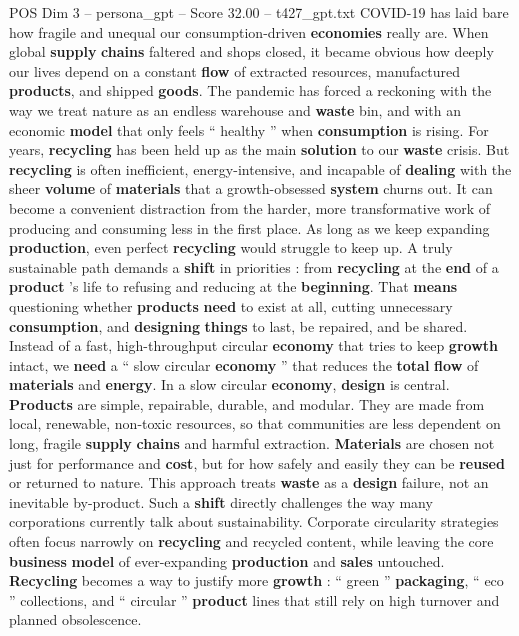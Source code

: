 \begin{textsample}{POS Dim 3 – persona\_gpt – Score 32.00 – t427\_gpt.txt}  \label{ex:f3_pos_026}
COVID-19 has laid bare how fragile and unequal our consumption-driven \textbf{economies} really are.
When global \textbf{supply} \textbf{chains} faltered and shops closed, it became obvious how deeply our lives depend on a constant \textbf{flow} of extracted resources, manufactured \textbf{products}, and shipped \textbf{goods}.
The pandemic has forced a reckoning with the way we treat nature as an endless warehouse and \textbf{waste} bin, and with an economic \textbf{model} that only feels “ healthy ” when \textbf{consumption} is rising.
For years, \textbf{recycling} has been held up as the main \textbf{solution} to our \textbf{waste} crisis.
But \textbf{recycling} is often inefficient, energy-intensive, and incapable of \textbf{dealing} with the sheer \textbf{volume} of \textbf{materials} that a growth-obsessed \textbf{system} churns out.
It can become a convenient distraction from the harder, more transformative work of producing and consuming less in the first place.
As long as we keep expanding \textbf{production}, even perfect \textbf{recycling} would struggle to keep up.
A truly sustainable path demands a \textbf{shift} in priorities : from \textbf{recycling} at the \textbf{end} of a \textbf{product} ’s life to refusing and reducing at the \textbf{beginning}.
That \textbf{means} questioning whether \textbf{products} \textbf{need} to exist at all, cutting unnecessary \textbf{consumption}, and \textbf{designing} \textbf{things} to last, be repaired, and be shared.
Instead of a fast, high-throughput circular \textbf{economy} that tries to keep \textbf{growth} intact, we \textbf{need} a “ slow circular \textbf{economy} ” that reduces the \textbf{total} \textbf{flow} of \textbf{materials} and \textbf{energy}.
In a slow circular \textbf{economy}, \textbf{design} is central. \textbf{Products} are simple, repairable, durable, and modular.
They are made from local, renewable, non-toxic resources, so that communities are less dependent on long, fragile \textbf{supply} \textbf{chains} and harmful extraction. \textbf{Materials} are chosen not just for performance and \textbf{cost}, but for how safely and easily they can be \textbf{reused} or returned to nature.
This approach treats \textbf{waste} as a \textbf{design} failure, not an inevitable by-product.
Such a \textbf{shift} directly challenges the way many corporations currently talk about sustainability.
Corporate circularity strategies often focus narrowly on \textbf{recycling} and recycled content, while leaving the core \textbf{business} \textbf{model} of ever-expanding \textbf{production} and \textbf{sales} untouched. \textbf{Recycling} becomes a way to justify more \textbf{growth} : “ green ” \textbf{packaging}, “ eco ” collections, and “ circular ” \textbf{product} lines that still rely on high turnover and planned obsolescence.

\end{textsample}
